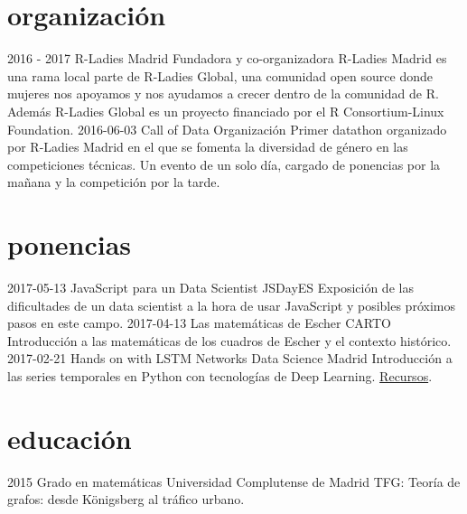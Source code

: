 \documentclass[]{friggeri-cv}
\begin{document}
\section{organización}

\begin{entrylist}
    \entry
    {2016 - 2017}
    {R-Ladies Madrid}
    {Fundadora y co-organizadora}
    {R-Ladies Madrid es una rama local parte de R-Ladies Global, una comunidad open source donde mujeres nos apoyamos y nos ayudamos a crecer dentro de la comunidad de R. Además R-Ladies Global es un proyecto financiado por el R Consortium-Linux Foundation.}
  \entry
    {2016-06-03}
    {Call of Data}
    {Organización}
    {Primer datathon organizado por R-Ladies Madrid en el que se fomenta la diversidad de género en las competiciones técnicas. Un evento de un solo día, cargado de ponencias por la mañana y la competición por la tarde.}
\end{entrylist}

\section{ponencias}

\begin{entrylist}
  \entry
    {2017-05-13}
    {JavaScript para un Data Scientist}
    {JSDayES}
    {Exposición de las dificultades de un data scientist a la hora de usar JavaScript y posibles próximos pasos en este campo.}
  \entry
    {2017-04-13}
    {Las matemáticas de Escher}
    {CARTO}
    {Introducción a las matemáticas de los cuadros de Escher y el contexto histórico.}
  \entry
    {2017-02-21}
    {Hands on with LSTM Networks}
    {Data Science Madrid}
    {Introducción a las series temporales en Python con tecnologías de Deep Learning. \href{https://github.com/chucheria/20170221_DSM-Workbook}{Recursos}.}
\end{entrylist}

\section{educación}

\begin{entrylist}
  \entry
    {2015}
    {Grado en matemáticas}
    {Universidad Complutense de Madrid}
    {TFG: Teoría de grafos: desde Königsberg al tráfico urbano.}
\end{entrylist}

\end{document}
